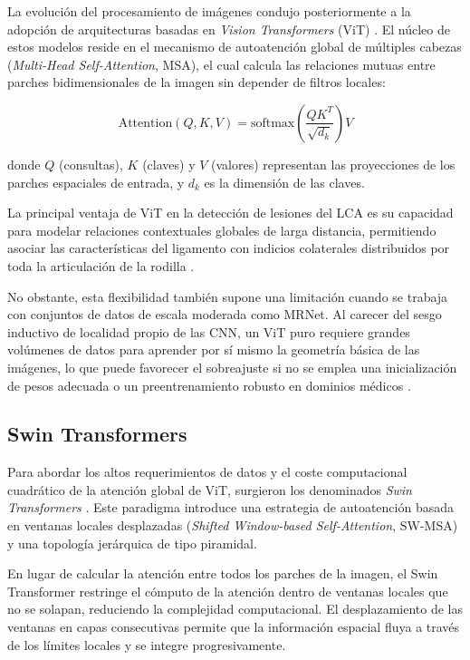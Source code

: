La evolución del procesamiento de imágenes condujo posteriormente a la adopción de arquitecturas basadas en \textit{Vision Transformers} (ViT) \cite{dosovitskiy2020image}. El núcleo de estos modelos reside en el mecanismo de autoatención global de múltiples cabezas (\textit{Multi-Head Self-Attention}, MSA), el cual calcula las relaciones mutuas entre parches bidimensionales de la imagen sin depender de filtros locales:

\begin{equation}
\text{Attention}(Q, K, V) = \text{softmax}\left(\frac{QK^T}{\sqrt{d_k}}\right)V
\end{equation}

\noindent donde $Q$ (consultas), $K$ (claves) y $V$ (valores) representan las proyecciones de los parches espaciales de entrada, y $d_k$ es la dimensión de las claves.

La principal ventaja de ViT en la detección de lesiones del LCA es su capacidad para modelar relaciones contextuales globales de larga distancia, permitiendo asociar las características del ligamento con indicios colaterales distribuidos por toda la articulación de la rodilla \cite{dai2021transmed}.

No obstante, esta flexibilidad también supone una limitación cuando se trabaja con conjuntos de datos de escala moderada como MRNet. Al carecer del sesgo inductivo de localidad propio de las CNN, un ViT puro requiere grandes volúmenes de datos para aprender por sí mismo la geometría básica de las imágenes, lo que puede favorecer el sobreajuste si no se emplea una inicialización de pesos adecuada o un preentrenamiento robusto en dominios médicos \cite{dai2021transmed}.

\subsection{Swin Transformers}

Para abordar los altos requerimientos de datos y el coste computacional cuadrático de la atención global de ViT, surgieron los denominados \textit{Swin Transformers} \cite{liu2021swin}. Este paradigma introduce una estrategia de autoatención basada en ventanas locales desplazadas (\textit{Shifted Window-based Self-Attention}, SW-MSA) y una topología jerárquica de tipo piramidal.

En lugar de calcular la atención entre todos los parches de la imagen, el Swin Transformer restringe el cómputo de la atención dentro de ventanas locales que no se solapan, reduciendo la complejidad computacional. El desplazamiento de las ventanas en capas consecutivas permite que la información espacial fluya a través de los límites locales y se integre progresivamente.


